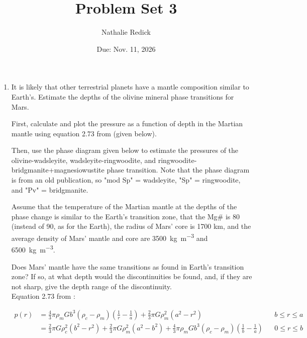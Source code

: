 \documentclass{template}
\title{\textbf{Problem Set 3}}
\author{Nathalie Redick}
\date{Due: Nov. 11, 2026}
\begin{document}
\maketitle
\thispagestyle{fancy}

\begin{enumerate}[label=\textbf{\arabic*.}]

\item It is likely that other terrestrial planets have a mantle composition similar to Earth's. Estimate the depths of the olivine mineral phase transitions for Mars.

First, calculate and plot the pressure as a function of depth in the Martian mantle using equation 2.73 from \textcite{turcotteGeodynamics2014} (given below).

Then, use the phase diagram given below to estimate the pressures of the olivine-wadsleyite, wadsleyite-ringwoodite, and ringwoodite-bridgmanite+magnesiowustite phase transition. Note that the phase diagram is from an old publication, so "mod Sp" = wadsleyite, "Sp" = ringwoodite, and "Pv" = bridgmanite.

Assume that the temperature of the Martian mantle at the depths of the phase change is similar to the Earth's transition zone, that the Mg\# is 80 (instead of 90, as for the Earth), the radius of Mars' core is 1700 km, and the average density of Mars' mantle and core are \qty{3500}{\kg\per\m\cubed} and \qty{6500}{\kg\per\m\cubed}.

Does Mars' mantle have the same transitions as found in Earth's transition zone? If so, at what depth would the discontinuities be found, and, if they are not sharp, give the depth range of the discontinuity.\\

Equation 2.73 from \textcite{turcotteGeodynamics2014}:

\begin{align}
p(r) &= \frac{4}{3}\pi\rho_m G b^3(\rho_c - \rho_m)\left(\frac{1}{r} - \frac{1}{a}\right)
      + \frac{2}{3}\pi G \rho_m^2 (a^2 - r^2)
      && b \leq r \leq a \nonumber \\
     &= \frac{2}{3}\pi G \rho_c^2 (b^2 - r^2)
      + \frac{2}{3}\pi G \rho_m^2 (a^2 - b^2) \nonumber
      + \frac{4}{3}\pi\rho_m G b^3(\rho_c - \rho_m)\left(\frac{1}{b} - \frac{1}{a}\right)
      && 0 \leq r \leq b
      \tag{2.73} %
\end{align}


\end{enumerate}
\end{document}
